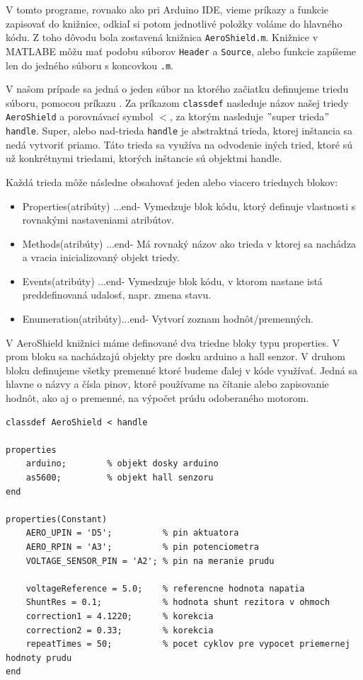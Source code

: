 V tomto programe, rovnako ako pri Arduino IDE, vieme príkazy a funkcie zapisovať do knižnice, odkiaľ si potom jednotlivé položky voláme do hlavného kódu. Z toho dôvodu bola zostavená knižnica \verb|AeroShield.m|. Knižnice v MATLABE môžu mať podobu súborov \verb|Header| a \verb|Source|, alebo funkcie zapíšeme len do jedného súboru s koncovkou \verb|.m|. 

V našom prípade sa jedná o jeden súbor na ktorého začiatku definujeme triedu súboru, pomocou príkazu . Za príkazom \verb|classdef| nasleduje názov našej triedy \verb|AeroShield| a porovnávací symbol $<$, za ktorým nasleduje $"$super trieda$"$ \verb|handle|. Super, alebo nad-trieda \verb|handle| je abstraktná trieda, ktorej inštancia sa nedá vytvoriť priamo. Táto trieda sa využíva na odvodenie iných tried, ktoré sú už konkrétnymi triedami, ktorých inštancie sú objektmi handle. 

Každá trieda môže následne obsahovať jeden alebo viacero triednych blokov: 
\begin{itemize}
	\item Properties(atribúty) ...end- Vymedzuje blok kódu, ktorý definuje vlastnosti s rovnakými nastaveniami atribútov.
	\item Methods(atribúty)    ...end- Má rovnaký názov ako trieda v ktorej sa nachádza a vracia inicializovaný objekt triedy.
	\item Events(atribúty)     ...end- Vymedzuje blok kódu, v ktorom nastane istá preddefinovaná udalosť, napr. zmena stavu. 
	\item Enumeration(atribúty)...end- Vytvorí zoznam hodnôt/premenných. 
\end{itemize}

V AeroShield knižnici máme definované dva triedne bloky typu properties. V prom bloku sa nachádzajú objekty pre dosku arduino a hall senzor. V druhom bloku definujeme všetky premenné ktoré budeme ďalej v kóde využívať. Jedná sa hlavne o názvy a čísla pinov, ktoré používame na čítanie alebo zapisovanie hodnôt, ako aj o premenné, na výpočet prúdu odoberaného motorom. 

\begin{lstlisting}[caption={Knižnica AeroShield.m properties.},captionpos=b]
classdef AeroShield < handle

properties
	arduino;		% objekt dosky arduino 
	as5600;			% objekt hall senzoru
end

properties(Constant)
	AERO_UPIN = 'D5';          % pin aktuatora 
	AERO_RPIN = 'A3';          % pin potenciometra
	VOLTAGE_SENSOR_PIN = 'A2'; % pin na meranie prudu
	
	voltageReference = 5.0;    % referencne hodnota napatia 
	ShuntRes = 0.1;            % hodnota shunt rezitora v ohmoch
	correction1 = 4.1220;	   % korekcia  				  
	correction2 = 0.33;        % korekcia
	repeatTimes = 50;          % pocet cyklov pre vypocet priemernej hodnoty prudu 
end		
\end{lstlisting}
		
